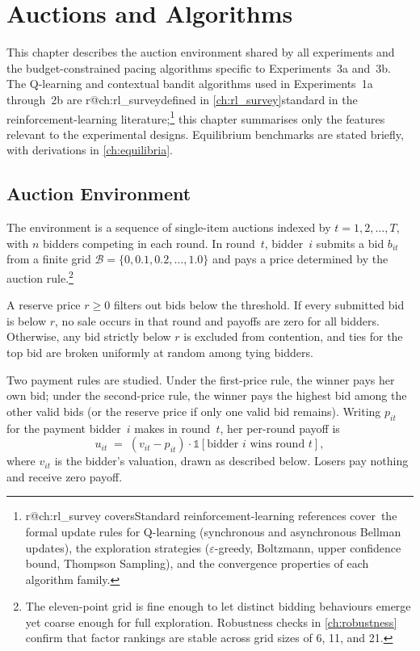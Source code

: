 \chapter{Auctions and Algorithms}
\label{ch:auctions_and_algorithms}

This chapter describes the auction environment shared by all experiments and the budget-constrained pacing algorithms specific to Experiments~3a and~3b. The Q-learning and contextual bandit algorithms used in Experiments~1a through~2b are \ifcsname r@ch:rl_survey\endcsname defined in \cref{ch:rl_survey}\else standard in the reinforcement-learning literature\fi;\footnote{\ifcsname r@ch:rl_survey\endcsname{} covers\else Standard reinforcement-learning references cover\fi\ the formal update rules for Q-learning (synchronous and asynchronous Bellman updates), the exploration strategies ($\varepsilon$-greedy, Boltzmann, upper confidence bound, Thompson Sampling), and the convergence properties of each algorithm family.} this chapter summarises only the features relevant to the experimental designs. Equilibrium benchmarks are stated briefly, with derivations in \cref{ch:equilibria}.

\section{Auction Environment}
\label{sec:env}

The environment is a sequence of single-item auctions indexed by $t = 1, 2, \ldots, T$, with $n$ bidders competing in each round. In round~$t$, bidder~$i$ submits a bid $b_{it}$ from a finite grid $\mathcal{B} = \{0, 0.1, 0.2, \ldots, 1.0\}$ and pays a price determined by the auction rule.\footnote{The eleven-point grid is fine enough to let distinct bidding behaviours emerge yet coarse enough for full exploration. Robustness checks in \cref{ch:robustness} confirm that factor rankings are stable across grid sizes of 6, 11, and 21.}

A reserve price $r \geq 0$ filters out bids below the threshold. If every submitted bid is below $r$, no sale occurs in that round and payoffs are zero for all bidders. Otherwise, any bid strictly below $r$ is excluded from contention, and ties for the top bid are broken uniformly at random among tying bidders.

Two payment rules are studied. Under the first-price rule, the winner pays her own bid; under the second-price rule, the winner pays the highest bid among the other valid bids (or the reserve price if only one valid bid remains). Writing $p_{it}$ for the payment bidder~$i$ makes in round~$t$, her per-round payoff is
\[
u_{it} \;=\; (v_{it} - p_{it}) \cdot \mathbb{1}[\text{bidder } i \text{ wins round } t],
\]
where $v_{it}$ is the bidder's valuation, drawn as described below. Losers pay nothing and receive zero payoff.

